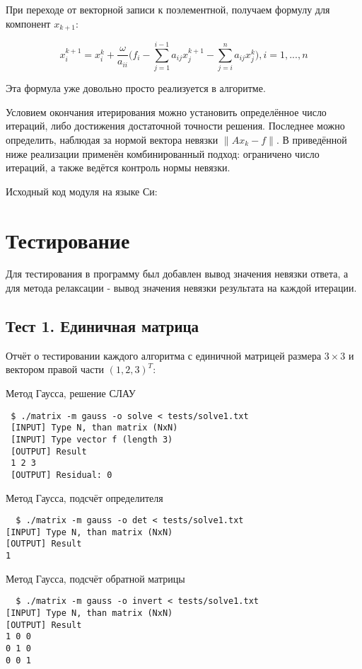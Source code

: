 \documentclass[a4paper,11pt]{report}
\begin{document}
При переходе от векторной записи к поэлементной, получаем формулу для компонент $x_{k+1}$:

$$x_i^{k+1} = x_i^k + \frac{\omega}{a_{ii}}\Bigg(f_i - \sum\limits_{j=1}^{i-1}a_{ij}x_j^{k+1} - \sum\limits_{j=i}^na_{ij}x_j^k\Bigg), i = 1,...,n$$

Эта формула уже довольно просто реализуется в алгоритме.

Условием окончания итерирования можно установить определённое число итераций, либо достижения достаточной точности решения. Последнее
можно определить, наблюдая за нормой вектора невязки $\|Ax_k - f\|$. В приведённой ниже реализации применён комбинированный подход:
ограничено число итераций, а также ведётся контроль нормы невязки.

Исходный код модуля на языке Си:



\section*{Тестирование}
Для тестирования в программу был добавлен вывод значения невязки ответа, а для метода релаксации - вывод значения невязки результата
на каждой итерации.

\subsection*{Тест 1. Единичная матрица}
Отчёт о тестировании каждого алгоритма с единичной матрицей размера $3\times3$ и вектором правой части $(1, 2, 3)^T$:

\begin{bash}
\caption{Метод Гаусса, решение СЛАУ}
\begin{verbatim}
 $ ./matrix -m gauss -o solve < tests/solve1.txt
 [INPUT] Type N, than matrix (NxN)
 [INPUT] Type vector f (length 3)
 [OUTPUT] Result
 1 2 3 
 [OUTPUT] Residual: 0
\end{verbatim}
\end{bash}

\begin{bash}
 \caption{Метод Гаусса, подсчёт определителя}
 \begin{verbatim}
  $ ./matrix -m gauss -o det < tests/solve1.txt 
[INPUT] Type N, than matrix (NxN)
[OUTPUT] Result
1
 \end{verbatim}
\end{bash}

\begin{bash}
 \caption{Метод Гаусса, подсчёт обратной матрицы}
 \begin{verbatim}
  $ ./matrix -m gauss -o invert < tests/solve1.txt 
[INPUT] Type N, than matrix (NxN)
[OUTPUT] Result
1 0 0 
0 1 0 
0 0 1 
 \end{verbatim}
\end{bash}
\end{document}
